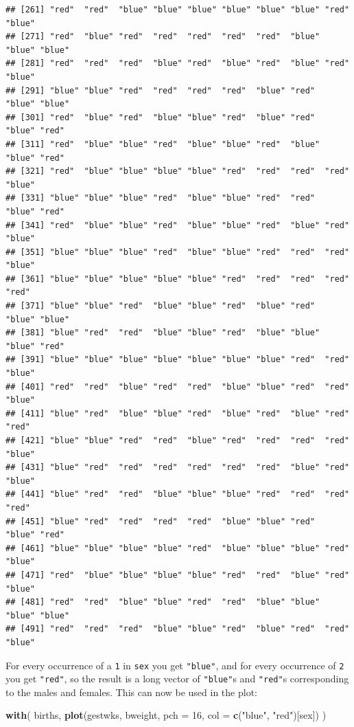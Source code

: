 \documentclass[
]{book}
\newenvironment{Shaded}{\begin{snugshade}}{\end{snugshade}}
\newcommand{\AttributeTok}[1]{\textcolor[rgb]{0.13,0.29,0.53}{#1}}
\newcommand{\DecValTok}[1]{\textcolor[rgb]{0.00,0.00,0.81}{#1}}
\newcommand{\FunctionTok}[1]{\textcolor[rgb]{0.13,0.29,0.53}{\textbf{#1}}}
\newcommand{\NormalTok}[1]{#1}
\newcommand{\StringTok}[1]{\textcolor[rgb]{0.31,0.60,0.02}{#1}}
\begin{document}
\begin{verbatim}
## [261] "red"  "red"  "blue" "blue" "blue" "blue" "blue" "blue" "red"  "blue"
## [271] "red"  "blue" "red"  "red"  "red"  "red"  "red"  "blue" "blue" "blue"
## [281] "red"  "red"  "red"  "blue" "red"  "blue" "red"  "blue" "red"  "blue"
## [291] "blue" "blue" "red"  "red"  "red"  "red"  "blue" "red"  "blue" "blue"
## [301] "red"  "blue" "red"  "blue" "blue" "red"  "blue" "red"  "blue" "red" 
## [311] "red"  "blue" "blue" "red"  "blue" "blue" "red"  "blue" "blue" "red" 
## [321] "red"  "blue" "blue" "blue" "blue" "red"  "red"  "red"  "red"  "blue"
## [331] "blue" "blue" "blue" "red"  "blue" "blue" "red"  "red"  "blue" "red" 
## [341] "red"  "blue" "blue" "red"  "blue" "blue" "red"  "blue" "red"  "blue"
## [351] "blue" "blue" "blue" "red"  "blue" "blue" "red"  "red"  "red"  "blue"
## [361] "blue" "blue" "blue" "blue" "blue" "red"  "red"  "red"  "red"  "red" 
## [371] "blue" "blue" "red"  "blue" "blue" "red"  "blue" "red"  "blue" "blue"
## [381] "blue" "red"  "red"  "blue" "blue" "red"  "blue" "blue" "blue" "red" 
## [391] "blue" "blue" "blue" "blue" "blue" "blue" "blue" "red"  "red"  "blue"
## [401] "red"  "red"  "blue" "red"  "red"  "blue" "blue" "red"  "red"  "blue"
## [411] "blue" "red"  "blue" "blue" "red"  "blue" "red"  "blue" "red"  "red" 
## [421] "blue" "blue" "red"  "red"  "blue" "red"  "red"  "red"  "red"  "blue"
## [431] "blue" "red"  "red"  "red"  "red"  "red"  "red"  "blue" "red"  "blue"
## [441] "blue" "red"  "red"  "blue" "blue" "blue" "red"  "red"  "red"  "red" 
## [451] "blue" "red"  "red"  "red"  "red"  "blue" "blue" "red"  "blue" "red" 
## [461] "blue" "blue" "blue" "blue" "red"  "blue" "blue" "blue" "red"  "blue"
## [471] "red"  "blue" "blue" "blue" "blue" "red"  "red"  "blue" "red"  "blue"
## [481] "red"  "red"  "blue" "blue" "red"  "red"  "blue" "blue" "blue" "blue"
## [491] "red"  "red"  "red"  "blue" "blue" "red"  "blue" "red"  "red"  "blue"
\end{verbatim}

For every occurrence of a \texttt{1} in \texttt{sex} you get
\texttt{"blue"}, and for every occurrence of \texttt{2} you get
\texttt{"red"}, so the result is a long vector of \texttt{"blue"}s and
\texttt{"red"}s corresponding to the males and females.
This can now be used in the plot:

\begin{Shaded}
\begin{Highlighting}[]
\FunctionTok{with}\NormalTok{(}
\NormalTok{  births, }
  \FunctionTok{plot}\NormalTok{(gestwks, bweight, }\AttributeTok{pch =} \DecValTok{16}\NormalTok{, }\AttributeTok{col =} \FunctionTok{c}\NormalTok{(}\StringTok{"blue"}\NormalTok{, }\StringTok{"red"}\NormalTok{)[sex])}
\NormalTok{)}
\end{Highlighting}
\end{Shaded}
\end{document}
